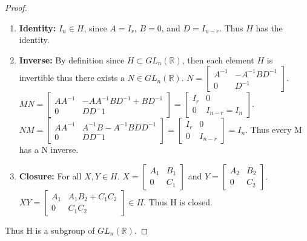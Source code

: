 \documentclass{article}
\newcommand{\R}{\mathbb{R}}
\begin{document}
\begin{proof}
    \begin{enumerate}{}
        \item \textbf{Identity: } $I_n \in H$, since $A = I_r$, $B = 0$, and $D = I_{n-r}$. Thus $H$ has the identity.
        \item \textbf{Inverse: } By definition since $H \subset GL_n(\R)$, then each element $H$ is invertible thus there exists a $N \in GL_n(\R)$. $N = \begin{bmatrix*}
            A^{-1} & -A^{-1}BD^{-1} \\
            0 & D^{-1}
        \end{bmatrix*}$. $MN = \begin{bmatrix}{}
            AA^{-1} & -AA^{-1}BD^{-1} + BD^{-1} \\
            0 & DD^-1
        \end{bmatrix} = \begin{bmatrix}{}
            I_{r} & 0 \\
            0 & I_{n-r} = I_n
        \end{bmatrix} $. $NM = \begin{bmatrix}{}
            AA^{-1} & A^{-1}B - A^{-1}BDD^{-1} \\
            0 & DD^-1
        \end{bmatrix} = \begin{bmatrix}{}
            I_{r} & 0 \\
            0 & I_{n-r}
        \end{bmatrix} = I_n$. Thus every M has a N inverse. 
        \item \textbf{Closure: } For all $X, Y \in H$. $X = \begin{bmatrix}
            A_1 & B_1 \\
            0 & C_1
        \end{bmatrix}$ and $Y = \begin{bmatrix}
            A_2 & B_2 \\
            0 & C_2
        \end{bmatrix}$. $XY = \begin{bmatrix}
            A_1 & A_1B_2 + C_1C_2 \\
            0 & C_1C_2
        \end{bmatrix} \in H$. Thus H is closed.
    \end{enumerate}

    Thus H is a subgroup of $GL_n(\R)$.
\end{proof}
\end{document}
